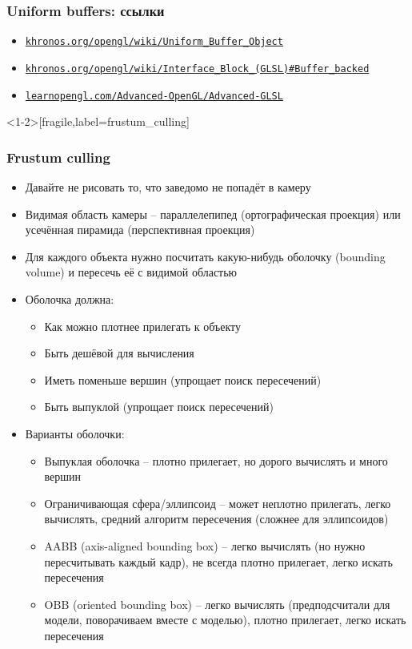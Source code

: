 \documentclass{beamer}
\begin{document}
\begin{frame}[fragile]
\fontsize{10pt}{10pt}
\frametitle{Uniform buffers: ссылки}
\begin{itemize}
\item \href{https://www.khronos.org/opengl/wiki/Uniform_Buffer_Object}{\nolinkurl{khronos.org/opengl/wiki/Uniform\_Buffer\_Object}}
\item \href{https://www.khronos.org/opengl/wiki/Interface_Block_(GLSL)#Buffer_backed}{\nolinkurl{khronos.org/opengl/wiki/Interface\_Block\_(GLSL)\#Buffer\_backed}}
\item \href{https://learnopengl.com/Advanced-OpenGL/Advanced-GLSL}{\nolinkurl{learnopengl.com/Advanced-OpenGL/Advanced-GLSL}}
\end{itemize}
\end{frame}

\begin{frame}<1-2>[fragile,label=frustum_culling]
\fontsize{10pt}{10pt}
\selectfont
\frametitle{Frustum culling}
\begin{itemize}
\item Давайте не рисовать то, что заведомо не попадёт в камеру
\pause
\item Видимая область камеры -- параллелепипед (ортографическая проекция) или усечённая пирамида (перспективная проекция)
\pause
\item Для каждого объекта нужно посчитать какую-нибудь оболочку (bounding volume) и пересечь её с видимой областью
\pause
\item Оболочка должна:
\begin{itemize}
\fontsize{10pt}{10pt}
\selectfont
\item Как можно плотнее прилегать к объекту
\pause
\item Быть дешёвой для вычисления
\pause
\item Иметь поменьше вершин (упрощает поиск пересечений)
\pause
\item Быть выпуклой (упрощает поиск пересечений)
\end{itemize}
\pause
\item Варианты оболочки:
\begin{itemize}
\fontsize{10pt}{10pt}
\selectfont
\item Выпуклая оболочка -- плотно прилегает, но дорого вычислять и много вершин
\pause
\item Ограничивающая сфера/эллипсоид -- может неплотно прилегать, легко вычислять, средний алгоритм пересечения (сложнее для эллипсоидов)
\pause
\item AABB (axis-aligned bounding box) -- легко вычислять (но нужно пересчитывать каждый кадр), не всегда плотно прилегает, легко искать пересечения
\pause
\item OBB (oriented bounding box) -- легко вычислять (предподсчитали для модели, поворачиваем вместе с моделью), плотно прилегает, легко искать пересечения
\end{itemize}
\end{itemize}
\end{frame}
\end{document}
